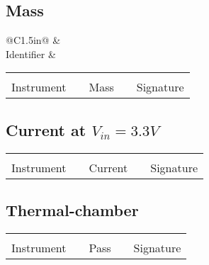 \subsection{Mass}
\vspace{15mm}
\begin{tabular}{@{}C{1.5in}@}
	\hrulefill & \hfill \\
	Identifier & \hfill \\
\end{tabular}
\vspace{25mm}

\begin{tabular}{@{}C{1.5in}p{1in}C{1.5in}p{1in}C{1.5in}@{}}
	\hrulefill & \hfill & \hrulefill & \hfill & \hrulefill\\
	Instrument & \hfill & Mass & \hfill & Signature \\
\end{tabular}

\subsection{Current at $V_{in}=3.3V$}
\vspace{25mm}
\begin{tabular}{@{}C{1.5in}p{1in}C{1.5in}p{1in}C{1.5in}@{}}
	\hrulefill & \hfill & \hrulefill & \hfill & \hrulefill\\
	Instrument & \hfill & Current & \hfill & Signature \\
\end{tabular}

\subsection{Thermal-chamber}
\vspace{25mm}
\begin{tabular}{@{}C{1.5in}p{1in}C{1.5in}p{1in}C{1.5in}@{}}
	\hrulefill & \hfill & \hrulefill & \hfill & \hrulefill\\
	Instrument & \hfill & Pass & \hfill & Signature \\
\end{tabular}


